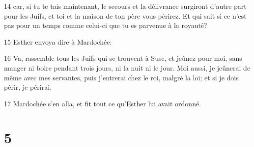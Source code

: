 \par 14 car, si tu te tais maintenant, le secours et la délivrance surgiront d'autre part pour les Juifs, et toi et la maison de ton père vous périrez. Et qui sait si ce n'est pas pour un temps comme celui-ci que tu es parvenue à la royauté?
\par 15 Esther envoya dire à Mardochée:
\par 16 Va, rassemble tous les Juifs qui se trouvent à Suse, et jeûnez pour moi, sans manger ni boire pendant trois jours, ni la nuit ni le jour. Moi aussi, je jeûnerai de même avec mes servantes, puis j'entrerai chez le roi, malgré la loi; et si je dois périr, je périrai.
\par 17 Mardochée s'en alla, et fit tout ce qu'Esther lui avait ordonné.

\chapter{5}

